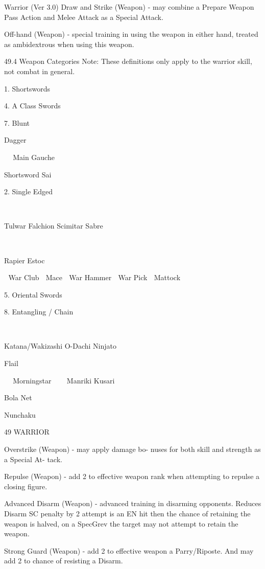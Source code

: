 \begin{Chapter}{Warrior (Ver 3.0)}
Draw  and  Strike  (Weapon)  -  may  combine  a 
Prepare Weapon Pass Action and Melee Attack as 
a Special Attack.  

Off-hand (Weapon) - special training in using the 
weapon  in  either  hand,  treated  as  ambidextrous 
when using this weapon.  

49.4 Weapon Categories 
Note: These definitions only apply to the warrior skill, not combat in general. 

1. Shortswords  

4. A Class Swords  

7. Blunt  

Dagger  

 
  Main Gauche  
 
 

Shortsword  
Sai 

2. Single Edged  

 
 
 
 

Tulwar  
Falchion  
Scimitar  
Sabre 

 
 

Rapier  
Estoc 

  War Club  
  Mace  
  War Hammer  
  War Pick  
  Mattock 

5. Oriental Swords  

8. Entangling / Chain  

 
 
 

Katana/Wakizashi  
O-Dachi  
Ninjato 

Flail  

 
  Morningstar  
 
 
  Manriki Kusari  
 

Bola  
Net  

Nunchaku 

49 WARRIOR 

Overstrike  (Weapon)  -  may  apply  damage  bo-
nuses  for  both  skill  and  strength  as  a  Special  At-
tack.  

Repulse  (Weapon)  -  add  2  to  effective  weapon 
rank when attempting to repulse a closing figure.  

Advanced  Disarm  (Weapon)  -  advanced  training 
in  disarming  opponents.  Reduces  Disarm  SC%
penalty  by  2%
attempt  is  an  EN  hit  then  the  chance  of  retaining 
the  weapon  is  halved,  on  a  SpecGrev  the  target 
may not attempt to retain the weapon.  

Strong  Guard  (Weapon)  -  add  2  to  effective 
weapon 
a 
Parry/Riposte. And may add 2%
to chance of resisting a Disarm.  


\end{Chapter}
